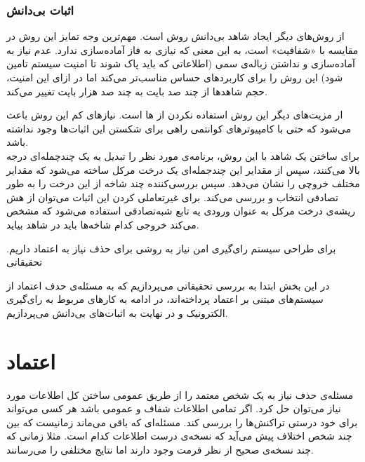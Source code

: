 \subsubsection{اثبات بی‌دانش }
از روش‌های دیگر ایجاد شاهد بی‌دانش روش 
\cite{zkstark}
است. مهم‌ترین وجه تمایز این روش در مقایسه با
 «شفافیت»
است، به این معنی که نیازی به فاز آماده‌سازی ندارد. عدم نیاز به آماده‌سازی و نداشتن زباله‌ی سمی (اطلاعاتی که باید پاک شوند تا امنیت سیستم تامین شود) این روش را برای کاربرد‌های حساس مناسب‌تر می‌کند اما در ازای این امنیت، حجم شاهد‌ها از چند صد بایت به چند صد هزار بایت تغییر می‌کند.
\par
ار مزیت‌های دیگر این روش استفاده نکردن از 
ها
است. نیاز‌های کم این روش باعث می‌شود که حتی با کامپیوتر‌های کوانتمی
 راهی برای شکستن این اثبات‌ها وجود نداشته باشد.
\\
برای ساختن یک شاهد با این روش، برنامه‌ی مورد نظر را تبدیل یه یک چندچمله‌ای درجه بالا می‌کنند، سپس از مقدایر این چندجمله‌ای یک درخت مرکل ساخته می‌شود که مقدایر مختلف خروچی را نشان می‌دهد. سپس بررسی‌کننده چند شاخه از این درخت را به طور تصادفی انتخاب و بررسی می‌کند. برای غیرتعاملی کردن این اثبات می‌توان از هش ریشه‌ی درخت مرکل به عنوان ورودی یه تابع شبه‌تصادفی
استفاده می‌شود که مشخص می‌کند خروجی کدام شاخه‌ها باید در شاهد بیاید. 





برای طراحی سیستم رای‌گیری امن نیاز به روشی برای حذف نیاز به اعتماد داریم. تحقیقاتی 

در این بخش ابتدا به بررسی تحقیقاتی می‌پردازیم که به مسئله‌ی حدف اعتماد از سیستم‌های مبتنی بر اعتماد پرداخته‌اند، در ادامه به کارهای مربوط به رای‌گیری الکترونیک و در نهایت به اثبات‌های بی‌دانش می‌پردازیم.

\section{اعتماد}
مسئله‌ی حذف نیاز به یک شخص معتمد را از طریق عمومی ساختن کل اطلاعات مورد نیاز می‌توان حل کرد. اگر تمامی اطلاعات شفاف و عمومی باشد هر کسی می‌تواند برای خود درستی تراکنش‌ها را بررسی کند. مسئله‌ای که باقی می‌ماند زمانیست که بین چند شخص اختلاف پیش می‌آید که نسخه‌ی درست اطلاعات کدام است. مثلا زمانی که چند نسخه‌ی صحیح از نظر فرمت وجود دارند اما نتایج مختلفی را می‌رسانند. 
